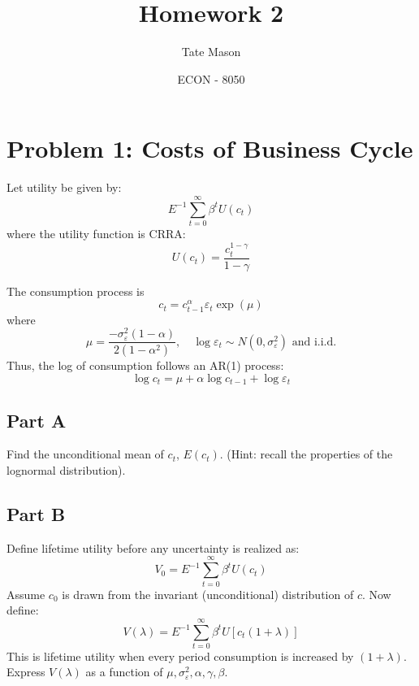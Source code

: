 \documentclass[10pt,a4paper]{article}
\title{Homework 2}
\author{Tate Mason}
\date{ECON - 8050}
\begin{document}
\maketitle

\section*{Problem 1: Costs of Business Cycle}
Let utility be given by:
\begin{equation*}
    E^{-1} \sum_{t=0}^{\infty} \beta^t U(c_t)
\end{equation*}
where the utility function is CRRA:
\begin{equation*}
    U(c_t) = \frac{c_t^{1-\gamma}}{1- \gamma}
\end{equation*}

The consumption process is
\begin{equation*}
    c_t = c_{t-1}^{\alpha} \varepsilon_t \exp(\mu)
\end{equation*}
where
\begin{equation*}
    \mu = \frac{-\sigma_{\varepsilon}^2 (1-\alpha)}{2 (1-\alpha^2)}, \quad \log \varepsilon_t \sim N(0, \sigma_{\varepsilon}^2) \text{ and i.i.d.}
\end{equation*}
Thus, the log of consumption follows an AR(1) process:
\begin{equation*}
    \log c_t = \mu + \alpha \log c_{t-1} + \log \varepsilon_t
\end{equation*}

\subsection*{Part A}
Find the unconditional mean of $c_t$, $E(c_t)$. (Hint: recall the properties of the lognormal distribution).

\subsection*{Part B}
Define lifetime utility before any uncertainty is realized as:
\begin{equation*}
    V_0 = E^{-1} \sum_{t=0}^{\infty} \beta^t U(c_t)
\end{equation*}
Assume $c_0$ is drawn from the invariant (unconditional) distribution of $c$.
Now define:
\begin{equation*}
    V(\lambda) = E^{-1} \sum_{t=0}^{\infty} \beta^t U [c_t(1 + \lambda)]
\end{equation*}
This is lifetime utility when every period consumption is increased by $(1+\lambda)$. Express $V(\lambda)$ as a function of $\mu, \sigma_{\varepsilon}^2, \alpha, \gamma, \beta$.
\end{document}
